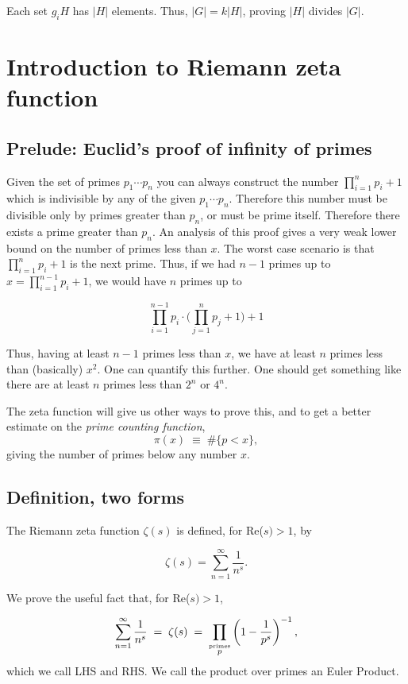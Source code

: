 \documentclass[12pt,letterpaper]{report}
\newcommand\be{\begin{equation}}
\newcommand\ee{\end{equation}}
\begin{document}
Each set $g_i H$ has $|H|$ elements. Thus, $|G| = k|H|$, proving
$|H|$ divides $|G|$.


\section{Introduction to Riemann zeta function}


\subsection{Prelude: Euclid's proof of infinity of primes}

Given the set of primes $p_1\cdots p_n$ you can always construct
the number $\prod_{i=1}^n p_i + 1$ which is indivisible by any of
the given $p_1\cdots p_n$. Therefore this number must be divisible
only by primes greater than $p_n$, or must be prime itself.
Therefore there exists a prime greater than $p_n$. An analysis of
this proof gives a very weak lower bound on the number of primes
less than $x$. The worst case scenario is that $\prod_{i=1}^n p_i
+ 1$ is the next prime. Thus, if we had $n-1$ primes up to $x =
\prod_{i=1}^{n-1} p_i + 1$, we would have $n$ primes up to

\be \prod_{i=1}^{n-1} p_i \cdot \Big(\prod_{j=1}^n p_j + 1\Big) +
1 \ee

Thus, having at least $n-1$ primes less than $x$, we have at least
$n$ primes less than (basically) $x^2$. One can quantify this
further. One should get something like there are at least $n$
primes less than $2^n$ or $4^n$.

The zeta function will give us other ways to prove this, and to
get a better estimate on the {\em prime counting function}, \be
    \pi (x) \; \equiv \; \#\{p<x\} ,
\ee giving the number of primes below any number $x$.


\subsection{Definition, two forms}

The Riemann zeta function $\zeta(s)$ is defined, for Re($s) > 1$,
by

\be \zeta(s) = \sum_{n=1}^\infty \frac{1}{n^s}. \ee

We prove the useful fact that, for Re($s) > 1$,

\be \sum_{n=1}^\infty\frac{1}{n^s} \; = \; \zeta(s) \; = \;
\prod_{\stackrel{\mbox{\tiny primes}}{p}} \left( 1 - \frac{1}{p^s}
\right)^{-1}, \ee which we call LHS and RHS. We call the product
over primes an Euler Product.
\end{document}
